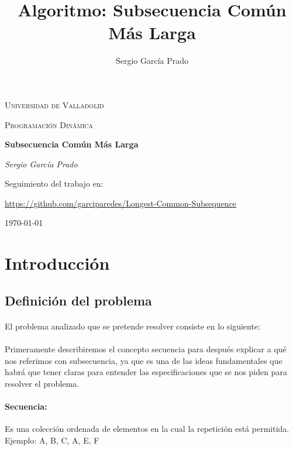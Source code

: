 \documentclass{article}
\title{Algoritmo: Subsecuencia Común Más Larga}
\author{Sergio García Prado}
\begin{document}
\begin{titlepage}
	\centering
	{\scshape\LARGE Universidad de Valladolid \par}
	\vspace{1cm}
	{\scshape\Large Programación Dinámica\par}
	\vspace{1.5cm}
	{\huge\bfseries Subsecuencia Común Más Larga\par}
	\vspace{2cm}
	{\Large\itshape Sergio García Prado\par}

	\vfill
	Seguimiento del trabajo en: \par
	\href{https://github.com/garciparedes/Longest-Common-Subsequence}{https://github.com/garciparedes/Longest-Common-Subsequence}

	\vfill


	{\large \today\par}
\end{titlepage}

\section{Introducción}

	\subsection{Definición del problema}

		\paragraph{}
		El problema analizado que se pretende resolver consiste en lo siguiente:

		\paragraph{}
		Primeramente describiremos el concepto secuencia para después explicar a qué nos referimos con subsecuencia, ya que es una de las ideas fundamentales que habrá que tener claras para entender las especificaciones que se nos piden para resolver el problema.

		\paragraph{Secuencia:}
		Es una colección ordenada de elementos en la cual la repetición está permitida.
		\newline{}
		Ejemplo: {A, B, C, A, E, F}
\end{document}
